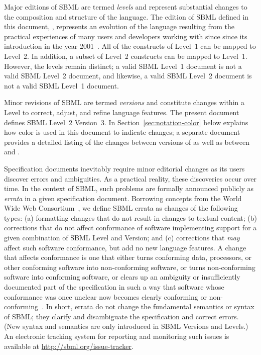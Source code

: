 Major editions of SBML are termed \emph{levels} and represent
substantial changes to the composition and structure of the
language.  The edition of SBML defined in this document, \sbmltwo,
represents an evolution of the language resulting from
the practical experiences of many users and developers working
with \sbmlone since since its introduction in the year
2001~\citep{hucka:2001,hucka:2003}.  All of the constructs of
Level~1 can be mapped to Level~2.  In addition, a subset of 
Level~2 constructs can be mapped to Level~1.  However, the
levels remain distinct; a valid SBML Level~1 document is not a
valid SBML Level~2 document, and likewise, a valid SBML Level~2
document is not a valid SBML Level~1 document.

Minor revisions of SBML are termed \emph{versions} and constitute
changes within a Level to correct, adjust, and refine
language features.  The present document defines SBML Level~2
Version~3.  In Section~\ref{sec:notation-color}
  below explains how color is used in this document to
  indicate changes; a separate document provides a detailed
listing of the changes between versions of \sbmltwo as well as
between \sbmltwothree and \sbmlonetwo.

Specification documents inevitably require minor editorial changes
as its users discover errors and ambiguities.  As a practical
reality, these discoveries occur over time.  In the context of
SBML, such problems are formally announced publicly as
\emph{errata} in a given specification document.  Borrowing
concepts from the World Wide Web Consortium~\citep{jacobs:2004},
we define SBML errata as changes of the following types: (a)
formatting changes that do not result in changes to textual
content; (b) corrections that do not affect conformance of
software implementing support for a given combination of SBML
Level and Version; and (c) corrections that \emph{may} affect such
software conformance, but add no new language features.  A change
that affects conformance is one that either turns conforming data,
processors, or other conforming software into non-conforming
software, or turns non-conforming software into conforming
software, or clears up an ambiguity or insufficiently documented
part of the specification in such a way that software whose
conformance was once unclear now becomes clearly conforming or
non-conforming~\citep{jacobs:2004}.  In short, errata do not
change the fundamental semantics or syntax of SBML; they clarify
and disambiguate the specification and correct errors.  (New
syntax and semantics are only introduced in SBML Versions and
Levels.)  An electronic tracking system for reporting and
monitoring such issues is available at
\url{http://sbml.org/issue-tracker}.

